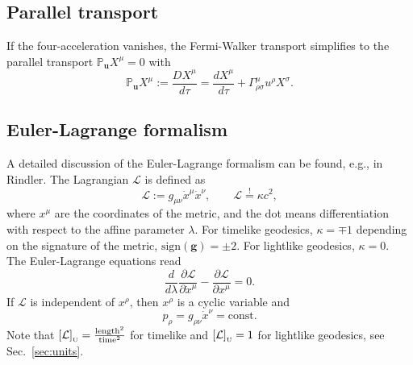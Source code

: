 \documentclass[10pt,twoside,notitlepage,a4paper,fleqn,openbib]{report}
\def\sign{\textrm{sign}}
\def\defequal{:=}
\def\uLength{\textrm{length}}
\def\uTime{\textrm{time}}
\newcommand{\evalUnits}[1]{\left[#1\right]_{\text{\tiny U}}}
\begin{document}
\subsection{Parallel transport}
If the four-acceleration vanishes, the Fermi-Walker transport simplifies to the parallel transport $\mathbb{P}_{\mathbf{u}}X^{\mu}=0$ with
\begin{equation}
  \mathbb{P}_{\mathbf{u}}X^{\mu}\defequal\frac{DX^{\mu}}{d\tau} = \frac{dX^{\mu}}{d\tau} + \Gamma_{\rho\sigma}^{\mu}u^{\rho}X^{\sigma}.
\end{equation}

\subsection{Euler-Lagrange formalism}\label{subsec:EL}
A detailed discussion of the Euler-Lagrange formalism can be found, e.g., in Rindler\cite{rindler}. The Lagrangian $\mathcal{L}$ is defined as
\begin{equation}
 \mathcal{L} \defequal g_{\mu\nu}\dot{x}^{\mu}\dot{x}^{\nu},\qquad \mathcal{L}\stackrel{!}{=}\kappa c^2,
\end{equation}
where $x^{\mu}$ are the coordinates of the metric, and the dot means differentiation with respect to the affine parameter $\lambda$. For timelike geodesics, $\kappa=\mp 1$ depending on the signature of the metric, $\sign(\mathbf{g})=\pm 2$. For lightlike geodesics, $\kappa=0$.\\[0.3em]
The Euler-Lagrange equations read
\begin{equation}
 \frac{d}{d\lambda}\frac{\partial\mathcal{L}}{\partial\dot{x}^{\mu}}-\frac{\partial\mathcal{L}}{\partial x^{\mu}} = 0.
\end{equation}
If $\mathcal{L}$ is independent of $x^{\rho}$, then $x^{\rho}$ is a cyclic variable and
\begin{equation}
  p_{\rho} = g_{\rho\nu}\dot{x}^{\nu} = \text{const}.
\end{equation}
Note that $\evalUnits{\mathcal{L}} = \frac{\uLength^2}{\uTime^2}$ for timelike and $\evalUnits{\mathcal{L}} = 1$ for lightlike geodesics, see Sec.~\ref{sec:units}.

\end{document}
